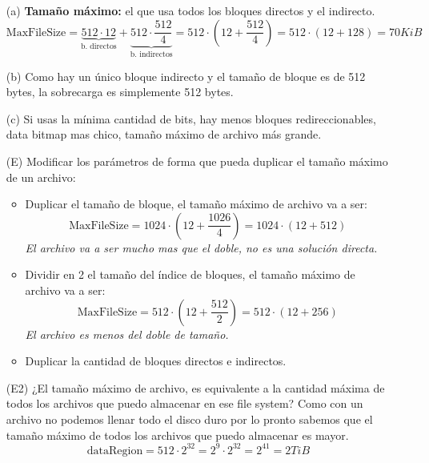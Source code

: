 \documentclass[12pt]{article}
\begin{document}
\begin{rta}
    \begin{itemize}
        \item[(a)] \textbf{Tamaño máximo:} el que usa todos los bloques directos y el indirecto.
        \begin{equation*}
            \text{MaxFileSize} = \underbrace{512 \cdot 12}_{\text{b. directos}} + \underbrace{512\cdot \frac{512}{4}}_{\text{b. indirectos}} = 512 \cdot \left(12 + \frac{512}{4}\right) = 512 \cdot (12 + 128) =70KiB
        \end{equation*}
        
        \item[(b)] Como hay un único bloque indirecto y el tamaño de bloque es de 512 bytes, la sobrecarga es simplemente 512 bytes.
        
        \item[(c)] Si usas la mínima cantidad de bits, hay menos bloques redireccionables, data bitmap mas chico, tamaño máximo de archivo más grande. 
        
        \item[(E)] Modificar los parámetros de forma que pueda duplicar el tamaño máximo de un archivo: 
        \begin{itemize}
            \item Duplicar el tamaño de bloque, el tamaño máximo de archivo va a ser:
            \begin{equation*}
                \text{MaxFileSize} = 1024 \cdot \left(12 + \frac{1026}{4}\right) = 1024 \cdot (12 + 512)
            \end{equation*}
            \textit{El archivo va a ser mucho mas que el doble, no es una solución directa.}
            \item Dividir en 2 el tamaño del índice de bloques, el tamaño máximo de archivo va a ser:
            \begin{equation*}
                \text{MaxFileSize} = 512 \cdot \left(12 + \frac{512}{2}\right) = 512 \cdot (12 + 256)
            \end{equation*}
            \textit{El archivo es menos del doble de tamaño.}
            \item Duplicar la cantidad de bloques directos e indirectos.
        \end{itemize}
        \item[(E2)] ¿El tamaño máximo de archivo, es equivalente a la cantidad máxima de todos los archivos que puedo almacenar en ese file system? Como con un archivo no podemos llenar todo el disco duro por lo pronto sabemos que el tamaño máximo de todos los archivos que puedo almacenar es mayor.
        \begin{equation*}
            \text{dataRegion} = 512 \cdot 2 ^{32} = 2^9 \cdot 2^{32} = 2^{41} = 2 TiB
        \end{equation*}
        
    \end{itemize}
\end{rta}
\end{document}
